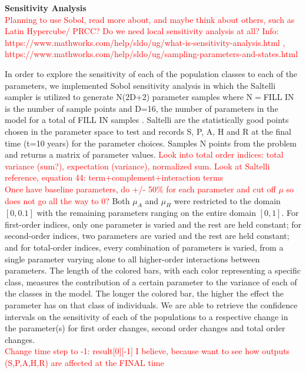 \documentclass[12pt]{article}
\begin{document}

\textbf{Sensitivity Analysis} \\
\textcolor{red}{Planning to use Sobol, read more about, and maybe think about others, such as Latin Hypercube/ PRCC? Do we need local sensitivity analysis at all? Info: https://www.mathworks.com/help/sldo/ug/what-is-sensitivity-analysis.html , https://www.mathworks.com/help/sldo/ug/sampling-parameters-and-states.html  } 

In order to explore the sensitivity of each of the population classes to each of the parameters, we implemented Sobol sensitivity analysis in which the Saltelli sampler is utilized to generate N(2D+2) parameter samples where N$=$FILL IN is the number of sample points and D=16, the number of parameters in the model for a total of FILL IN samples \cite{Herman}. 
Saltelli are the statistically good points chosen in the parameter space to test and records S, P, A, H and R at the final time (t=10 years) for the parameter choices. Samples N points from the problem and returns a matrix of parameter values. 
\textcolor{red}{Look into total order indices: total variance (sum?), expectation (variance), normalized sum. Look at Saltelli reference, equation 44: term+complement+interaction terms} \\
\textcolor{red}{Once have baseline parameters, do +/- 50\% for each parameter and cut off $\mu$ so does not go all the way to 0?}
Both $\mu_{A}$ and $\mu_{H}$ were restricted to the domain $[0,0.1]$ with the remaining parameters ranging on the entire domain $[0,1]$. For first-order indices, only one parameter is varied and the rest are held constant; for second-order indices, two parameters are varied and the rest are held constant; and for total-order indices, every combination of parameters is varied, from a single parameter varying alone to all higher-order interactions between parameters. The length of the colored bars, with each color representing a specific class, measures the contribution of a certain parameter to the variance of each of the classes in the model. The longer the colored bar, the higher the effect the parameter has on that class of individuals. We are able to retrieve the confidence intervals on the sensitivity of each of the populations to a respective change in the parameter(s) for first order changes, second order changes and total order changes. \\
\textcolor{red}{Change time step to -1: result[0][-1] I believe, because want to see how outputs (S,P,A,H,R) are affected at the FINAL time}
\end{document}
